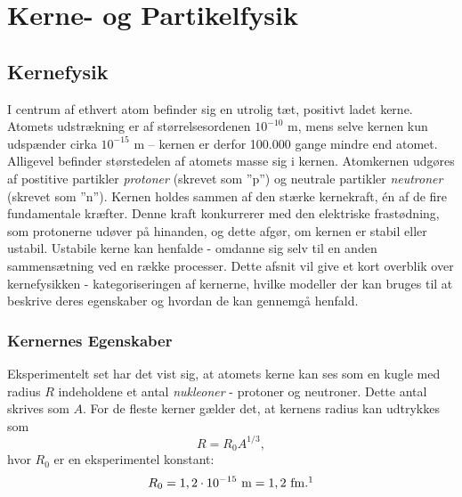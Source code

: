\chapter{Kerne- og Partikelfysik}
\section{Kernefysik}
I centrum af ethvert atom befinder sig en utrolig tæt, positivt ladet kerne. Atomets udstrækning er af størrelsesordenen $10^{-10}$ m, mens selve kernen kun udspænder cirka $10^{-15}$ m -- kernen er derfor 100.000 gange mindre end atomet. Alligevel befinder størstedelen af atomets masse sig i kernen. Atomkernen udgøres af postitive partikler \textit{protoner} (skrevet som ''p'') og neutrale partikler \textit{neutroner} (skrevet som ''n''). Kernen holdes sammen af den stærke kernekraft, én af de fire fundamentale kræfter. Denne kraft konkurrerer med den elektriske frastødning, som protonerne udøver på hinanden, og dette afgør, om kernen er stabil eller ustabil. Ustabile kerne kan henfalde - omdanne sig selv til en anden sammensætning ved en række processer. 
Dette afsnit vil give et kort overblik over kernefysikken - kategoriseringen af kernerne, hvilke modeller der kan bruges til at beskrive deres egenskaber og hvordan de kan gennemgå henfald. 

\subsection{Kernernes Egenskaber}
Eksperimentelt set har det vist sig, at atomets kerne kan ses som en kugle med radius $R$ indeholdene et antal \textit{nukleoner} - protoner og neutroner. Dette antal skrives som $A$. 
For de fleste kerner gælder det, at kernens radius kan udtrykkes som 
\begin{equation}
R = R_0A^{1/3},
\end{equation}
hvor $R_0$ er en eksperimentel konstant:
\begin{equation}
R_0 = 1,2\cdot {10^{-15}} ~ \SI{}{\m} = 1,2 ~\SI{}{\femto\m}. \footnotemark
\end{equation}


